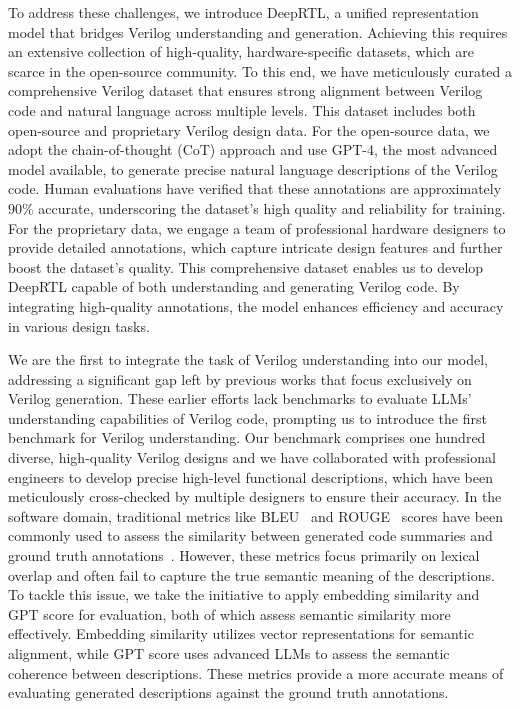 To address these challenges, we introduce DeepRTL, a unified representation model that bridges Verilog understanding and generation. Achieving this requires an extensive collection of high-quality, hardware-specific datasets, which are scarce in the open-source community. To this end, we have meticulously curated a comprehensive Verilog dataset that ensures strong alignment between Verilog code and natural language across multiple levels. This dataset includes both open-source and proprietary Verilog design data. For the open-source data, we adopt the chain-of-thought (CoT) approach and use GPT-4, the most advanced model available, to generate precise natural language descriptions of the Verilog code. 
Human evaluations have verified that these annotations are approximately $90\%$ accurate, underscoring the dataset's high quality and reliability for training. 
For the proprietary data, we engage a team of professional hardware designers to provide detailed annotations, which capture intricate design features and further boost the dataset's quality.
This comprehensive dataset enables us to develop DeepRTL capable of both understanding and generating Verilog code. By integrating high-quality annotations, the model enhances efficiency and accuracy in various design tasks.

We are the first to integrate the task of Verilog understanding into our model, addressing a significant gap left by previous works that focus exclusively on Verilog generation. These earlier efforts lack benchmarks to evaluate LLMs' understanding capabilities of Verilog code, prompting us to introduce the first benchmark for Verilog understanding.
Our benchmark comprises one hundred diverse, high-quality Verilog designs and we have collaborated with professional engineers to develop precise high-level functional descriptions, which have been meticulously cross-checked by multiple designers to ensure their accuracy.
In the software domain, traditional metrics like BLEU~\citep{papineni2002bleu} and ROUGE~\citep{lin2004rouge} scores %
have been commonly used to assess the similarity between generated code summaries and ground truth annotations~\citep{wang2023codet5+}. %
However, these metrics focus primarily on lexical overlap and often fail to capture the true semantic meaning of the descriptions. 
To tackle this issue, we take the initiative to apply embedding similarity and GPT score for evaluation, both of which assess semantic similarity more effectively.
Embedding similarity utilizes vector representations for semantic alignment, while GPT score uses advanced LLMs to assess the semantic coherence between descriptions. 
These metrics provide a more accurate means of evaluating generated descriptions against the ground truth annotations.

